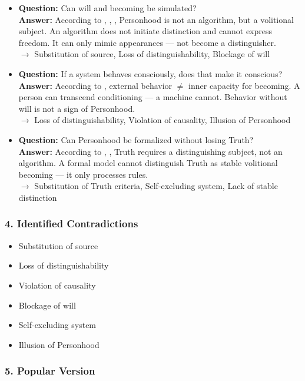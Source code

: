 \documentclass[12pt]{article}
\begin{document}
\begin{itemize}
\item \textbf{Question:} Can will and becoming be simulated?\\
\textbf{Answer:} According to \text{[12.2]}, \text{[11.3.2]}, \text{[4.3]}, Personhood is not an algorithm, but a volitional subject. An algorithm does not initiate distinction and cannot express freedom. It can only mimic appearances — not become a distinguisher.\\
$\rightarrow$ Substitution of source, Loss of distinguishability, Blockage of will

\item \textbf{Question:} If a system behaves consciously, does that make it conscious?\\
\textbf{Answer:} According to \text{[12.2]}, external behavior $\neq$ inner capacity for becoming. A person can transcend conditioning — a machine cannot. Behavior without will is not a sign of Personhood.\\
$\rightarrow$ Loss of distinguishability, Violation of causality, Illusion of Personhood

\item \textbf{Question:} Can Personhood be formalized without losing Truth?\\
\textbf{Answer:} According to \text{[11.2]}, \text{[11.3.1]}, Truth requires a distinguishing subject, not an algorithm. A formal model cannot distinguish Truth as stable volitional becoming — it only processes rules.\\
$\rightarrow$ Substitution of Truth criteria, Self-excluding system, Lack of stable distinction
\end{itemize}

\subsubsection*{4. Identified Contradictions}

\begin{itemize}
\item Substitution of source
\item Loss of distinguishability
\item Violation of causality
\item Blockage of will
\item Self-excluding system
\item Illusion of Personhood
\end{itemize}

\subsubsection*{5. Popular Version}
\end{document}
